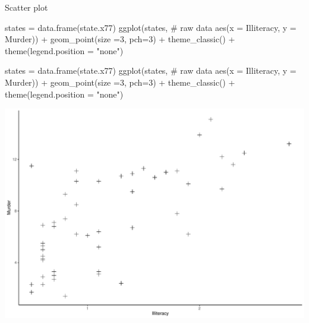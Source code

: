 \documentclass[
  ignorenonframetext,
]{beamer}
\newenvironment{Shaded}{\begin{snugshade}}{\end{snugshade}}
\newcommand{\AttributeTok}[1]{\textcolor[rgb]{0.00,0.34,0.68}{#1}}
\newcommand{\CommentTok}[1]{\textcolor[rgb]{0.54,0.53,0.53}{#1}}
\newcommand{\DecValTok}[1]{\textcolor[rgb]{0.69,0.50,0.00}{#1}}
\newcommand{\FunctionTok}[1]{\textcolor[rgb]{0.39,0.29,0.61}{#1}}
\newcommand{\NormalTok}[1]{\textcolor[rgb]{0.12,0.11,0.11}{#1}}
\newcommand{\OtherTok}[1]{\textcolor[rgb]{0.00,0.43,0.16}{#1}}
\newcommand{\SpecialCharTok}[1]{\textcolor[rgb]{0.24,0.68,0.91}{#1}}
\newcommand{\StringTok}[1]{\textcolor[rgb]{0.75,0.01,0.01}{#1}}
\begin{document}
\begin{frame}[fragile]{Scatter plot}
\protect\hypertarget{scatter-plot}{}
\begin{Shaded}
\begin{Highlighting}[]
\NormalTok{states }\OtherTok{=} \FunctionTok{data.frame}\NormalTok{(state.x77)}
\FunctionTok{ggplot}\NormalTok{(states,  }\CommentTok{\# raw data}
               \FunctionTok{aes}\NormalTok{(}\AttributeTok{x =}\NormalTok{ Illiteracy, }\AttributeTok{y =}\NormalTok{ Murder)) }\SpecialCharTok{+} \FunctionTok{geom\_point}\NormalTok{(}\AttributeTok{size =}\DecValTok{3}\NormalTok{, }\AttributeTok{pch=}\DecValTok{3}\NormalTok{) }\SpecialCharTok{+} \FunctionTok{theme\_classic}\NormalTok{() }\SpecialCharTok{+} \FunctionTok{theme}\NormalTok{(}\AttributeTok{legend.position =} \StringTok{"none"}\NormalTok{)}
\end{Highlighting}
\end{Shaded}

\begin{Shaded}
\begin{Highlighting}[]
\NormalTok{states }\OtherTok{=} \FunctionTok{data.frame}\NormalTok{(state.x77)}
\FunctionTok{ggplot}\NormalTok{(states,  }\CommentTok{\# raw data}
               \FunctionTok{aes}\NormalTok{(}\AttributeTok{x =}\NormalTok{ Illiteracy, }\AttributeTok{y =}\NormalTok{ Murder)) }\SpecialCharTok{+} \FunctionTok{geom\_point}\NormalTok{(}\AttributeTok{size =}\DecValTok{3}\NormalTok{, }\AttributeTok{pch=}\DecValTok{3}\NormalTok{) }\SpecialCharTok{+} \FunctionTok{theme\_classic}\NormalTok{() }\SpecialCharTok{+} \FunctionTok{theme}\NormalTok{(}\AttributeTok{legend.position =} \StringTok{"none"}\NormalTok{)}
\end{Highlighting}
\end{Shaded}

\begin{center}\includegraphics[width=0.7\linewidth]{Practice_files/figure-beamer/unnamed-chunk-64-1} \end{center}
\end{frame}
\end{document}
